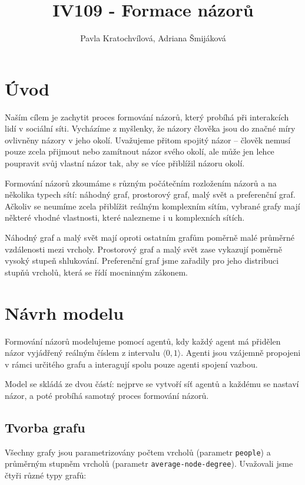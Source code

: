 \documentclass[10pt,a4paper]{report}
\author{Pavla Kratochvílová, Adriana Šmijáková}
\title{IV109 - Formace názorů}
\begin{document}
\maketitle
\chapter{Úvod}
Naším cílem je zachytit proces formování názorů, který probíhá při interakcích lidí v sociální síti. Vycházíme z myšlenky, že názory člověka jsou do značné míry ovlivněny názory v jeho okolí. Uvažujeme přitom spojitý názor -- člověk nemusí pouze zcela přijmout nebo zamítnout názor svého okolí, ale může jen lehce poupravit svůj vlastní názor tak, aby se více přiblížil názoru okolí. 

Formování názorů zkoumáme s různým počátečním rozložením názorů a na několika typech sítí: náhodný graf, prostorový graf, malý svět a preferenční graf. Ačkoliv se neumíme zcela přiblížit reálným komplexním sítím, vybrané grafy mají některé vhodné vlastnosti, které nalezneme i u komplexních sítích. 

Náhodný graf a malý svět mají oproti ostatním grafům poměrně malé průměrné vzdálenosti mezi vrcholy. Prostorový graf a malý svět zase vykazují poměrně vysoký stupeň shlukování. Preferenční graf jsme zařadily pro jeho distribuci stupňů vrcholů, která se řídí mocninným zákonem.

\chapter{Návrh modelu}
Formování názorů modelujeme pomocí agentů, kdy každý agent má přidělen názor vyjádřený reálným číslem z intervalu $\langle 0, 1 \rangle$. Agenti jsou vzájemně propojeni v rámci určitého grafu a interagují spolu pouze agenti spojení vazbou.

Model se skládá ze dvou částí: nejprve se vytvoří síť agentů a každému se nastaví názor, a poté probíhá samotný proces formování názorů.

\section{Tvorba grafu}
Všechny grafy jsou parametrizovány počtem vrcholů (parametr \texttt{people}) a prů\-měr\-ným stupněm vrcholů (parametr \texttt{average-node-degree}). Uvažovali jsme čtyři různé typy grafů:
\end{document}

